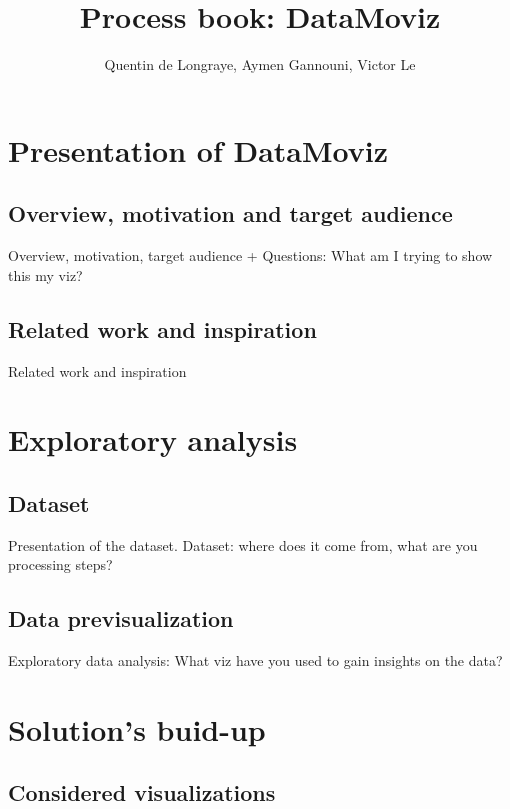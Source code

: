 \documentclass[a4paper,10pt]{article}
\begin{document}
\title{Process book: DataMoviz}
\author{Quentin de Longraye, Aymen Gannouni, Victor Le}

\maketitle

\tableofcontents

\newpage

\section{Presentation of DataMoviz}

\subsection{Overview, motivation and target audience}

Overview, motivation, target audience
+ Questions: What am I trying to show this my viz?

\subsection{Related work and inspiration}

Related work and inspiration

\section{Exploratory analysis}

\subsection{Dataset}

Presentation of the dataset.
Dataset: where does it come from, what are you processing steps?

\subsection{Data previsualization}

Exploratory data analysis: What viz have you used to gain insights on the data?

\section{Solution's buid-up}

\subsection{Considered visualizations}
\end{document}
